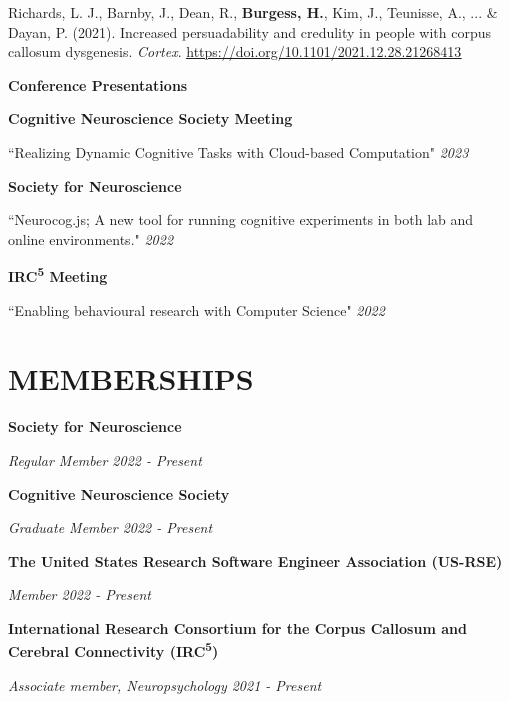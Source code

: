 \documentclass{article}
\begin{document}
  Richards, L. J., Barnby, J., Dean, R., \textbf{Burgess, H.}, Kim, J., Teunisse, A., ... \& Dayan, P. (2021). Increased persuadability and credulity in people with corpus callosum dysgenesis. \textit{Cortex}.
  \href{https://doi.org/10.1101/2021.12.28.21268413}{\color{blue}\underline{https://doi.org/10.1101/2021.12.28.21268413}}

  \medbreak

  {\large\textbf{Conference Presentations}}

  \textbf{Cognitive Neuroscience Society Meeting}

  ``Realizing Dynamic Cognitive Tasks with Cloud-based Computation" \hfill \textit{2023}

  \medbreak

  \textbf{Society for Neuroscience}

  ``Neurocog.js; A new tool for running cognitive experiments in both lab and online environments." \hfill \textit{2022}

  \medbreak

  \textbf{IRC\textsuperscript{5} Meeting}

  ``Enabling behavioural research with Computer Science" \hfill \textit{2022}

  \pagebreak

  \section*{\centering\uppercase{Memberships}}

  {\textbf{Society for Neuroscience}}

  \textit{Regular Member \hfill 2022 - Present}

  \medbreak

  {\textbf{Cognitive Neuroscience Society}}

  \textit{Graduate Member \hfill 2022 - Present}

  \medbreak

  {\textbf{The United States Research Software Engineer Association (US-RSE)}}

  \textit{Member \hfill 2022 - Present}

  \medbreak

  {\textbf{International Research Consortium for the Corpus Callosum and Cerebral Connectivity (IRC\textsuperscript{5})}}

  \textit{Associate member, Neuropsychology \hfill 2021 - Present}

  \medbreak
\end{document}
